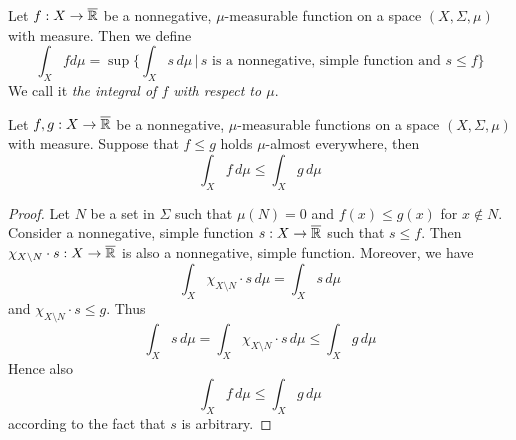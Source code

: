 \begin{definition}
Let $f:X\rightarrow \overline{{\mathbb R}}$ be a nonnegative, $\mu$-measurable function on a space $(X,\Sigma,\mu)$ with measure. Then we define 
$$\int_X f d\mu = \sup\bigg\{\int_X s\, d\mu\,\bigg|\,s\mbox{ is a nonnegative, simple function and }s\leq f\bigg\}$$
We call it \textit{the integral of $f$ with respect to $\mu$}.
\end{definition}

\begin{fact}\label{fact:integral_is_monotone}
Let $f,g:X\rightarrow \overline{{\mathbb R}}$ be a nonnegative, $\mu$-measurable functions on a space $(X,\Sigma,\mu)$ with measure. Suppose that $f\leq g$ holds $\mu$-almost everywhere, then
$$\int_Xf\,d\mu \leq \int_Xg\,d\mu$$
\end{fact}
\begin{proof}
Let $N$ be a set in $\Sigma$ such that $\mu(N) = 0$ and $f(x)\leq g(x)$ for $x\not \in N$. Consider a nonnegative, simple function $s:X\rightarrow \overline{{\mathbb R}}$ such that $s\leq f$. Then $\chi_{X\setminus N}\cdot s:X\rightarrow \overline{{\mathbb R}}$ is also a nonnegative, simple function. Moreover, we have
$$\int_X\chi_{X\setminus N}\cdot s\,d\mu = \int_Xs\,d\mu$$
and $\chi_{X\setminus N}\cdot s \leq g$. Thus
$$\int_Xs\,d\mu = \int_X\chi_{X\setminus N}\cdot s\,d\mu \leq \int_Xg\,d\mu$$
Hence also
$$\int_Xf\,d\mu \leq \int_Xg\,d\mu$$
according to the fact that $s$ is arbitrary.
\end{proof}

